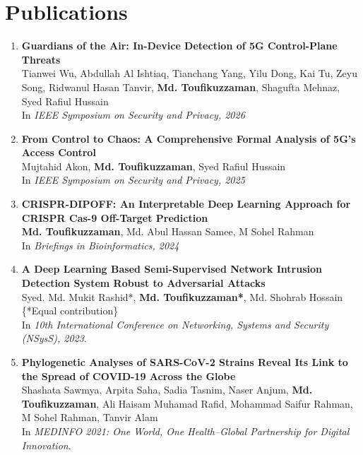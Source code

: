 \section{Publications}

\begin{enumerate}
    \item \textbf{Guardians of the Air: In-Device Detection of 5G Control-Plane Threats}\\
    Tianwei Wu, Abdullah Al Ishtiaq, Tianchang Yang, Yilu Dong, Kai Tu, Zeyu Song, Ridwanul Hasan Tanvir, \textbf{Md. Toufikuzzaman}, Shagufta Mehnaz, Syed Rafiul Hussain\\
    In \textit{IEEE Symposium on Security and Privacy, 2026} 

    \item \textbf{From Control to Chaos: A Comprehensive Formal Analysis of 5G’s Access Control}\\
    Mujtahid Akon, \textbf{Md. Toufikuzzaman}, Syed Rafiul Hussain\\
    In \textit{IEEE Symposium on Security and Privacy, 2025 }  
    
    \item \textbf{CRISPR-DIPOFF: An Interpretable Deep Learning Approach for CRISPR Cas-9 Off-Target Prediction}\\
    \textbf{Md. Toufikuzzaman}, Md. Abul Hassan Samee, M Sohel Rahman\\
    In \textit{Briefings in Bioinformatics, 2024 }   
    
    \item \textbf{A Deep Learning Based Semi-Supervised Network Intrusion Detection System Robust to Adversarial Attacks}\\
    Syed. Md. Mukit Rashid*, \textbf{Md. Toufikuzzaman*}, Md. Shohrab Hossain\\
    \{*Equal contribution\}\\
    In \textit{10th International Conference on Networking, Systems and Security (NSysS), 2023}.
    
    \item \textbf{Phylogenetic Analyses of SARS-CoV-2 Strains Reveal Its Link to the Spread of COVID-19 Across the Globe}\\
    Shashata Sawmya, Arpita Saha, Sadia Tasnim, Naser Anjum, \textbf{Md. Toufikuzzaman}, Ali Haisam Muhamad Rafid, Mohammad Saifur Rahman, M Sohel Rahman, Tanvir Alam\\
    In \textit{MEDINFO 2021: One World, One Health–Global Partnership for Digital Innovation}.  


\end{enumerate}
